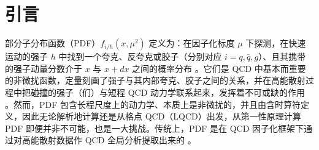 \section{引言}
\label{sec:intro}

部分子分布函数（PDF）$f_{i/h}(x,\mu^2)$ 定义为：在因子化标度 $\mu$ 下探测，在快速运动的强子 $h$ 中找到一个夸克、反夸克或胶子（分别对应 $i=q,\bar{q},g$）、且其携带的强子动量分数介于 $x$ 与 $x+dx$ 之间的概率分布 \cite{Collins:1989gx}。它们是 QCD 中基本而重要的非微扰函数，定量刻画了强子与其内部夸克、胶子之间的关系，并在高能散射过程中把碰撞的强子（们）与短程 QCD 动力学联系起来，发挥着不可或缺的作用 \cite{Brambilla:2014jmp}。然而，PDF 包含长程尺度上的动力学、本质上是非微扰的，并且由含时算符定义，因此无论解析地计算还是从格点 QCD（LQCD）出发，从第一性原理计算 PDF 即便并非不可能，也是一大挑战。传统上，PDF 是在 QCD 因子化框架下通过对高能散射数据作 QCD 全局分析提取出来的 \cite{Dulat:2015mca,Martin:2009iq,Ball:2014uwa,Alekhin:2013nda,Ethier:2017zbq}。

